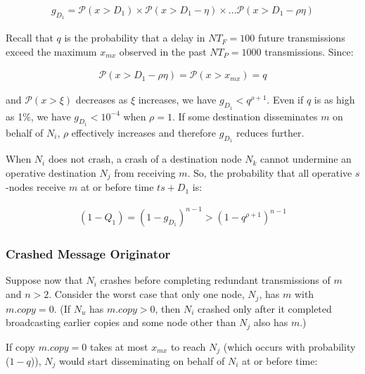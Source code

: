         \begin{equation*}
		    \begin{aligned}
		        g_{D_1}= \mathcal{P}(x > D_1) \times \mathcal{P}(x > D_1 - \eta) \times \ldots \mathcal{P}(x > D_1 - \rho \eta)
		    \end{aligned}
		\end{equation*}

		
		Recall that $q$ is the probability that a delay in $NT_F=100$ future transmissions exceed the maximum $x_{mx}$ observed in the past $NT_P=1000$ transmissions. Since:
        
        \begin{equation*}
		    \begin{aligned}
		        \mathcal{P}(x > D_1 - \rho \eta) = \mathcal{P}(x > x_{mx}) = q
		    \end{aligned}
		\end{equation*}
		
and $\mathcal{P}(x > \xi)$ decreases as $\xi$ increases, we have $g_{D_1} < q^{\rho+1}$.  Even if $q$ is as high as 1\%, we have $g_{D_1} < 10^{-4}$ when $\rho=1$. If some destination disseminates $m$ on behalf of $N_i$, $\rho$ effectively increases and therefore $g_{D_1}$ reduces further.

When $N_i$ does not crash, a crash of a destination node $N_{k}$ cannot undermine an operative destination $N_{j}$ from receiving $m$. So, the probability that all operative $s$-nodes receive $m$ at or before time $ts +D_1$ is:

        \begin{equation*}
		    \begin{aligned}
		        (1-Q_1)=(1-g_{D_1})^{n-1}>(1-q^{\rho+1})^{n-1}
		    \end{aligned}
		\end{equation*}


        \subsubsection*{Crashed Message Originator}
Suppose now that $N_i$ crashes before completing redundant transmissions of $m$ and $n>2$. Consider the worst case that only one node, $N_j$, has $m$ with $m.copy=0$. (If $N_u$ has $m.copy>0$, then $N_i$ crashed only after it completed broadcasting earlier copies and some node other than $N_j$ also has $m$.)

If copy $m.copy = 0$ takes at most $x_{mx}$ to reach $N_j$ (which occurs with probability ($1-q$)), $N_j$ would start disseminating on behalf of $N_i$ at or before time:
        
